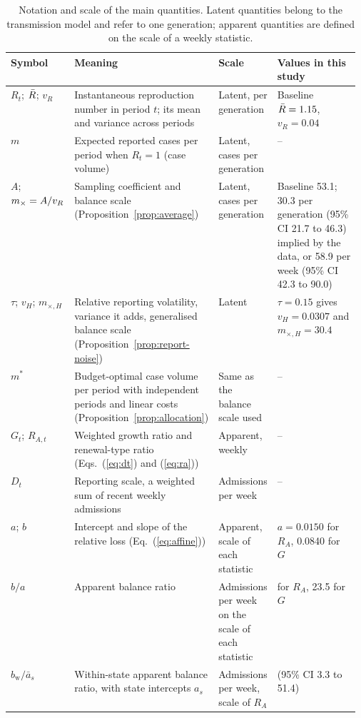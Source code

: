 \begin{table}[t]
\centering
\footnotesize
\caption{Notation and scale of the main quantities. Latent quantities belong to the transmission model and refer to one generation; apparent quantities are defined on the scale of a weekly statistic.}
\label{tab:notation}
\begin{tabularx}{\linewidth}{>{\raggedright\arraybackslash}p{0.17\linewidth}>{\raggedright\arraybackslash}X>{\raggedright\arraybackslash}p{0.16\linewidth}>{\raggedright\arraybackslash}p{0.24\linewidth}}
\toprule
Symbol & Meaning & Scale & Values in this study \\
\midrule
$R_t$; $\bar{R}$; $v_R$ & Instantaneous reproduction number in period $t$; its mean and variance across periods & Latent, per generation & Baseline $\bar{R}=1.15$, $v_R=0.04$ \\
$m$ & Expected reported cases per period when $R_t=1$ (case volume) & Latent, cases per generation & -- \\
$A$; $m_{\times}=A/v_R$ & Sampling coefficient and balance scale (Proposition~\ref{prop:average}) & Latent, cases per generation & Baseline 53.1; 30.3 per generation (95\% CI 21.7 to 46.3) implied by the data, or 58.9 per week (95\% CI 42.3 to 90.0) \\
$\tau$; $v_H$; $m_{\times,H}$ & Relative reporting volatility, variance it adds, generalised balance scale (Proposition~\ref{prop:report-noise}) & Latent & $\tau=0.15$ gives $v_H=0.0307$ and $m_{\times,H}=30.4$ \\
$m^*$ & Budget-optimal case volume per period with independent periods and linear costs (Proposition~\ref{prop:allocation}) & Same as the balance scale used & -- \\
$G_t$; $R_{A,t}$ & Weighted growth ratio and renewal-type ratio (Eqs.~(\ref{eq:dt}) and (\ref{eq:ra})) & Apparent, weekly & -- \\
$D_t$ & Reporting scale, a weighted sum of recent weekly admissions & Admissions per week & -- \\
$a$; $b$ & Intercept and slope of the relative loss (Eq.~(\ref{eq:affine})) & Apparent, scale of each statistic & $a=0.0150$ for $R_A$, 0.0840 for $G$ \\
$b/a$ & Apparent balance ratio & Admissions per week on the scale of each statistic & 37.4 for $R_A$, 23.5 for $G$ \\
$b_{\mathrm{w}}/\bar{a}_s$ & Within-state apparent balance ratio, with state intercepts $a_s$ & Admissions per week, scale of $R_A$ & 17.3 (95\% CI 3.3 to 51.4) \\

\end{tabularx}
\end{table}
